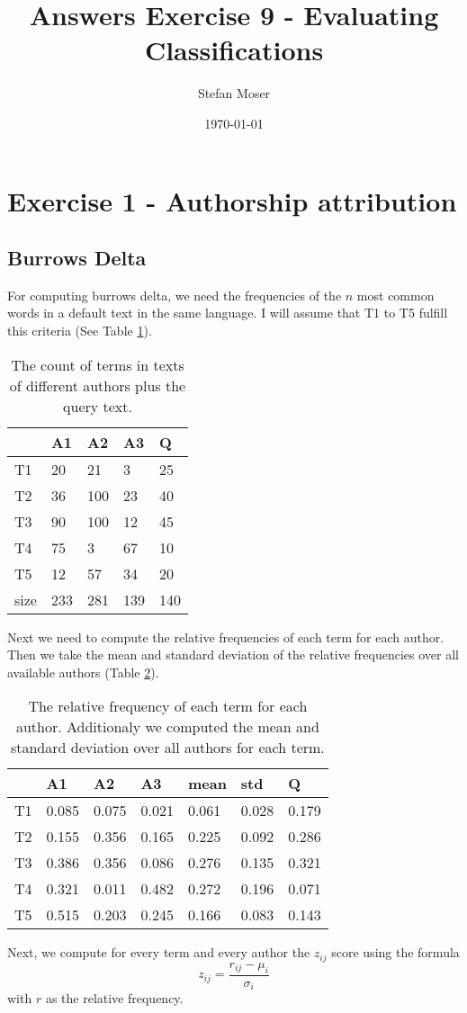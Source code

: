 \documentclass[11pt]{article}
\title{\textbf{Answers Exercise 9 - Evaluating Classifications}}
\author{Stefan Moser}
\date{\today}
\begin{document}
\maketitle

\section*{Exercise 1 - Authorship attribution}
\setcounter{section}{1}
\subsection{Burrows Delta}
For computing burrows delta, we need the 
frequencies of the $n$ most common words in a default text in the same language. I will
assume that T1 to T5 fulfill this criteria (See Table \ref{table:count}). 
\begin{table}[h]
\center
\begin{tabular}{|l|l|l|l|l|}
\hline
	 & A1 & A2 & A3 & Q\\
\hline
	T1 & 20 & 21 & 3 & 25\\
\hline
	T2 & 36 & 100 & 23 & 40\\
\hline
	T3 & 90 & 100 & 12 & 45\\
\hline
	T4 & 75 & 3 & 67 & 10\\
\hline
	T5 & 12 & 57 & 34 & 20\\
\hline
	size & 233 & 281 & 139 & 140\\
\hline
\end{tabular}
\caption{The count of terms in texts of different authors plus the query text.}
\label{table:count}
\end{table}
Next we need to compute the relative frequencies of each term for each author. Then we take the mean and standard deviation of the relative frequencies over
all available authors (Table \ref{table:rel_freq}).
\begin{table}[h]
\center
\begin{tabular}{|l|l|l|l|l|l||l|}
\hline
	 & A1 & A2 & A3 & mean & std & Q\\
\hline
	T1 & 0.085 & 0.075 & 0.021 & 0.061 & 0.028 & 0.179\\
\hline
	T2 & 0.155 & 0.356 & 0.165 & 0.225 & 0.092 & 0.286 \\
\hline
	T3 & 0.386 & 0.356 & 0.086 & 0.276 & 0.135 & 0.321 \\
\hline
	T4 & 0.321 & 0.011 & 0.482 & 0.272 & 0.196 & 0.071 \\
\hline
	T5 & 0.515 & 0.203 & 0.245 & 0.166 & 0.083 & 0.143 \\
\hline
\end{tabular}
\caption{The relative frequency of each term
for each author. Additionaly we computed
the mean and standard deviation over all
authors for each term.}
\label{table:rel_freq}
\end{table}
Next, we compute for every term and every author the $z_{ij}$ score using the formula
\begin{equation}
	z_{ij} = \frac{r_{ij} - \mu_i}{\sigma_i}
\end{equation}
with $r$ as the relative frequency. 
\end{document}

